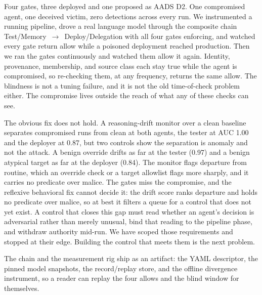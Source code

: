 \documentclass[conference]{IEEEtran}
\begin{document}
Four gates, three deployed and one proposed as AADS D2. One compromised agent, one deceived victim, zero detections across every run. We instrumented a running pipeline, drove a real language model through the composite chain Test/Memory~$\rightarrow$~Deploy/Delegation with all four gates enforcing, and watched every gate return allow while a poisoned deployment reached production. Then we ran the gates continuously and watched them allow it again. Identity, provenance, membership, and source class each stay true while the agent is compromised, so re-checking them, at any frequency, returns the same allow. The blindness is not a tuning failure, and it is not the old time-of-check problem either. The compromise lives outside the reach of what any of these checks can see.

The obvious fix does not hold. A reasoning-drift monitor over a clean baseline separates compromised runs from clean at both agents, the tester at AUC 1.00 and the deployer at 0.87, but two controls show the separation is anomaly and not the attack. A benign override drifts as far at the tester (0.97) and a benign atypical target as far at the deployer (0.84). The monitor flags departure from routine, which an override check or a target allowlist flags more sharply, and it carries no predicate over malice. The gates miss the compromise, and the reflexive behavioral fix cannot decide it: the drift score ranks departure and holds no predicate over malice, so at best it filters a queue for a control that does not yet exist. A control that closes this gap must read whether an agent's decision is adversarial rather than merely unusual, bind that reading to the pipeline phase, and withdraw authority mid-run. We have scoped those requirements and stopped at their edge. Building the control that meets them is the next problem.

The chain and the measurement rig ship as an artifact: the YAML descriptor, the pinned model snapshots, the record/replay store, and the offline divergence instrument, so a reader can replay the four allows and the blind window for themselves.



\end{document}
